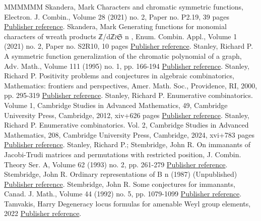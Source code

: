 \begin{thebibliography}{MMMMMM}
 Skandera, Mark Characters and chromatic symmetric functions, Electron. J. Combin., Volume 28 (2021) no. 2, Paper no. P2.19, 39 pages \href{https://alco.centre-mersenne.org/articles/10.5802/alco.459/#SkanCCS}{Publisher reference}.
 Skandera, Mark Generating functions for monomial characters of wreath products ℤ/dℤ\(\wr\)\(\mathfrak{S}\) n , Enum. Combin. Appl., Volume 1 (2021) no. 2, Paper no. S2R10, 10 pages \href{https://alco.centre-mersenne.org/articles/10.5802/alco.459/#SkanGenFnWreath}{Publisher reference}.
 Stanley, Richard P. A symmetric function generalization of the chromatic polynomial of a graph, Adv. Math., Volume 111 (1995) no. 1, pp. 166-194 \href{https://alco.centre-mersenne.org/articles/10.5802/alco.459/#StanSymm}{Publisher reference}.
 Stanley, Richard P. Positivity problems and conjectures in algebraic combinatorics, Mathematics: frontiers and perspectives, Amer. Math. Soc., Providence, RI, 2000, pp. 295-319 \href{https://alco.centre-mersenne.org/articles/10.5802/alco.459/#StanPos}{Publisher reference}.
 Stanley, Richard P. Enumerative combinatorics. Volume 1, Cambridge Studies in Advanced Mathematics, 49, Cambridge University Press, Cambridge, 2012, xiv+626 pages \href{https://alco.centre-mersenne.org/articles/10.5802/alco.459/#StanEC1}{Publisher reference}.
 Stanley, Richard P. Enumerative combinatorics. Vol. 2, Cambridge Studies in Advanced Mathematics, 208, Cambridge University Press, Cambridge, 2024, xvi+783 pages \href{https://alco.centre-mersenne.org/articles/10.5802/alco.459/#StanEC2}{Publisher reference}.
 Stanley, Richard P.; Stembridge, John R. On immanants of Jacobi-Trudi matrices and permutations with restricted position, J. Combin. Theory Ser. A, Volume 62 (1993) no. 2, pp. 261-279 \href{https://alco.centre-mersenne.org/articles/10.5802/alco.459/#StanStemIJT}{Publisher reference}.
 Stembridge, John R. Ordinary representations of B n  (1987) (Unpublished) \href{https://alco.centre-mersenne.org/articles/10.5802/alco.459/#StemOrdRep}{Publisher reference}.
 Stembridge, John R. Some conjectures for immanants, Canad. J. Math., Volume 44 (1992) no. 5, pp. 1079-1099 \href{https://alco.centre-mersenne.org/articles/10.5802/alco.459/#StemConj}{Publisher reference}.
 Tamvakis, Harry Degeneracy locus formulas for amenable Weyl group elements, 2022 \href{https://alco.centre-mersenne.org/articles/10.5802/alco.459/#TamvakisAmenable}{Publisher reference}.

\end{thebibliography}
